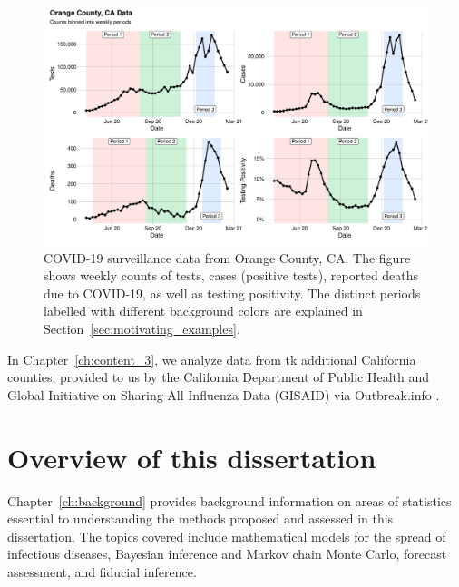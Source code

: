 \begin{figure}
    \centering
    \includegraphics[width=1.0\columnwidth]{binned_data_plot}
    \caption[COVID-19 surveillance data from Orange County, CA.]{
    COVID-19 surveillance data from Orange County, CA.
    The figure shows weekly counts of tests, cases (positive tests), reported deaths due to COVID-19, as well as testing positivity.
    The distinct periods labelled with different background colors are explained in Section~\ref{sec:motivating_examples}.}
    \label{ch_1:fig:binned_data_plot}
\end{figure}

In Chapter~\ref{ch:content_3}, we analyze data from tk additional California counties, provided to us by the California Department of Public Health and Global Initiative on Sharing All Influenza Data (GISAID) \citep{shu2017gisaid} via Outbreak.info \citep{Gangavarapu2023}.

\section{Overview of this dissertation}
Chapter~\ref{ch:background} provides background information on areas of statistics essential to understanding the methods proposed and assessed in this dissertation.
The topics covered include mathematical models for the spread of infectious diseases, Bayesian inference and Markov chain Monte Carlo, forecast assessment, and fiducial inference.

